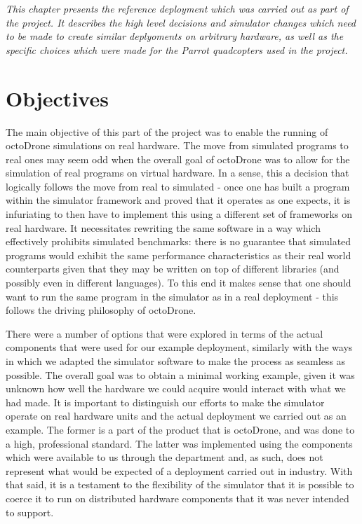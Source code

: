 \emph{This chapter presents the reference deployment which was carried out as part of the project. It describes the high level decisions and simulator changes which need to be made to create similar deplyoments on arbitrary hardware, as well as the specific choices which were made for the Parrot quadcopters used in the project.}

\section{Objectives}
The main objective of this part of the project was to enable the running of octoDrone simulations on real hardware. The move from simulated programs to real ones may seem odd when the overall goal of octoDrone was to allow for the simulation of real programs on virtual hardware. In a sense, this a decision that logically follows the move from real to simulated - once one has built a program within the simulator framework and proved that it operates as one expects, it is infuriating to then have to implement this using a different set of frameworks on real hardware. It necessitates rewriting the same software in a way which effectively prohibits simulated benchmarks: there is no guarantee that simulated programs would exhibit the same performance characteristics as their real world counterparts given that they may be written on top of different libraries (and possibly even in different languages). To this end it makes sense that one should want to run the same program in the simulator as in a real deployment - this follows the driving philosophy of octoDrone.

There were a number of options that were explored in terms of the actual components that were used for our example deployment, similarly with the ways in which we adapted the simulator software to make the process as seamless as possible. The overall goal was to obtain a minimal working example, given it was unknown how well the hardware we could acquire would interact with what we had made. It is important to distinguish our efforts to make the simulator operate on real hardware units and the actual deployment we carried out as an example. The former is a part of the product that is octoDrone, and was done to a high, professional standard. The latter was implemented using the components which were available to us through the department and, as such, does not represent what would be expected of a deployment carried out in industry. With that said, it is a testament to the flexibility of the simulator that it is possible to coerce it to run on distributed hardware components that it was never intended to support.

